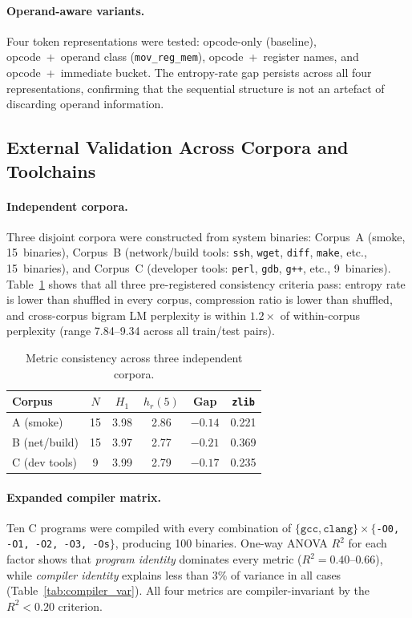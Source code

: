 \documentclass[10pt,twocolumn]{article}
\newcommand{\zlib}{\texttt{zlib}}
\begin{document}
\paragraph{Operand-aware variants.}
Four token representations were tested: opcode-only (baseline),
opcode~+~operand class (\texttt{mov\_reg\_mem}), opcode~+~register names,
and opcode~+~immediate bucket.  The entropy-rate gap persists across all
four representations, confirming that the sequential structure is not an
artefact of discarding operand information.

\subsection{External Validation Across Corpora and Toolchains}

\paragraph{Independent corpora.}
Three disjoint corpora were constructed from system binaries:
Corpus~A (smoke, 15~binaries), Corpus~B (network/build tools:
\texttt{ssh}, \texttt{wget}, \texttt{diff}, \texttt{make}, etc.,
15~binaries), and Corpus~C (developer tools: \texttt{perl}, \texttt{gdb},
\texttt{g++}, etc., 9~binaries).  Table~\ref{tab:corpora} shows that all
three pre-registered consistency criteria pass: entropy rate is lower than
shuffled in every corpus, compression ratio is lower than shuffled, and
cross-corpus bigram LM perplexity is within $1.2\times$ of within-corpus
perplexity (range 7.84--9.34 across all train/test pairs).

\begin{table}[h]
\centering
\caption{Metric consistency across three independent corpora.}
\label{tab:corpora}
\small
\begin{tabular}{@{}lccccc@{}}
\toprule
\textbf{Corpus} & $N$ & $H_1$ & $h_r(5)$ & \textbf{Gap} & \zlib{} \\
\midrule
A (smoke)     & 15 & 3.98 & 2.86 & $-0.14$ & 0.221 \\
B (net/build) & 15 & 3.97 & 2.77 & $-0.21$ & 0.369 \\
C (dev tools) &  9 & 3.99 & 2.79 & $-0.17$ & 0.235 \\
\bottomrule
\end{tabular}
\end{table}

\paragraph{Expanded compiler matrix.}
Ten C programs were compiled with every combination of
$\{\texttt{gcc}, \texttt{clang}\} \times \{$\texttt{-O0, -O1, -O2, -O3, -Os}$\}$,
producing 100 binaries.  One-way ANOVA $R^2$ for each factor shows that
\emph{program identity} dominates every metric
($R^2 = 0.40$--$0.66$), while \emph{compiler identity} explains less than
$3\%$ of variance in all cases (Table~\ref{tab:compiler_var}).
All four metrics are compiler-invariant by the $R^2 < 0.20$ criterion.
\end{document}
